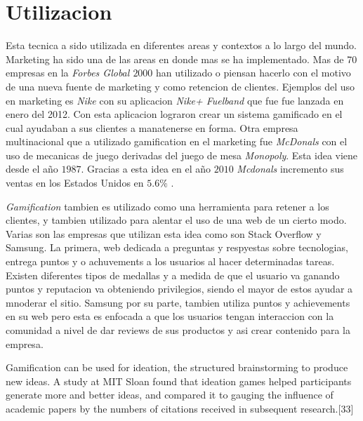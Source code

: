 \section{Utilizacion}

Esta tecnica a sido utilizada en diferentes areas y contextos a lo largo del mundo. Marketing ha sido una 
de las areas en donde mas se ha implementado. Mas de 70 empresas en la \emph{Forbes Global $2000$} han
utilizado o piensan hacerlo con el motivo de una nueva fuente de marketing y como retencion de 
clientes\cite{Gam:Util:1}. Ejemplos del uso en marketing es \emph{Nike} con su aplicacion \emph{Nike+ Fuelband} que
fue fue lanzada en enero del 2012\cite{Gam:Util:2}. Con esta aplicacion lograron crear un sistema 
gamificado en el cual ayudaban a sus clientes a manatenerse en forma. Otra empresa multinacional que a utilizado
gamification en el marketing fue \emph{McDonals} con el uso de mecanicas de juego derivadas del juego de mesa 
\emph{Monopoly}. Esta idea viene desde el año $1987$. Gracias a esta idea en el año $2010$ \emph{Mcdonals} 
incremento sus ventas en los Estados Unidos en $5.6\%$ \cite{Gam:Util:2}.


\emph{Gamification} tambien es utilizado como una herramienta para retener a los clientes, y tambien utilizado 
para alentar el uso de una web de un cierto modo. Varias son las empresas que utilizan esta idea como son 
Stack Overflow y Samsung. La primera, web dedicada a preguntas y respyestas sobre tecnologias, entrega puntos y o 
achuvements a los usuarios al hacer determinadas tareas. Existen diferentes tipos de medallas y a medida de que el usuario va ganando puntos y reputacion va obteniendo privilegios, siendo el mayor de estos ayudar a mnoderar el sitio.
Samsung por su parte, tambien utiliza puntos y achievements en su web pero esta es enfocada a que los usuarios 
tengan interaccion con la comunidad a nivel de dar reviews de sus productos y asi crear contenido para la
empresa\cite{Gam:Util:3}.



Gamification can be used for ideation, the structured brainstorming to produce new ideas. A study at MIT Sloan found that ideation games helped participants generate more and better ideas, and compared it to gauging the influence of academic papers by the numbers of citations received in subsequent research.[33]

